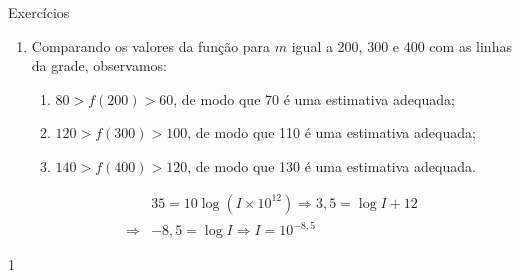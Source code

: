 \def\currentcolor{cor1}
\marginpar{\vspace{.5em}}
\begin{answer}{Exercícios}
{
	\exerciselist
	\begin{enumerate}
	\item Comparando os valores da função para $m$ igual a 200, 300 e 400 com as linhas da grade, observamos:
	\begin{enumerate}
	\item $80>f(200)>60$, de modo que 70 é uma estimativa adequada;
	\item $120>f(300)>100$, de modo que 110 é uma estimativa adequada;
	\item $140>f(400)>120$, de modo que 130 é uma estimativa adequada.
	\end{enumerate}

	\Item 
	\begin{align*}
	& 35 = 10 \log(I \times 10^{12}) \Rightarrow   3{,}5 = \log I + 12\\
	\Rightarrow & -8{,}5 = \log I \Rightarrow I = 10^{-8{,}5}
	\end{align*}
	\end{enumerate}
}{1}
\end{answer}
\clearmargin
